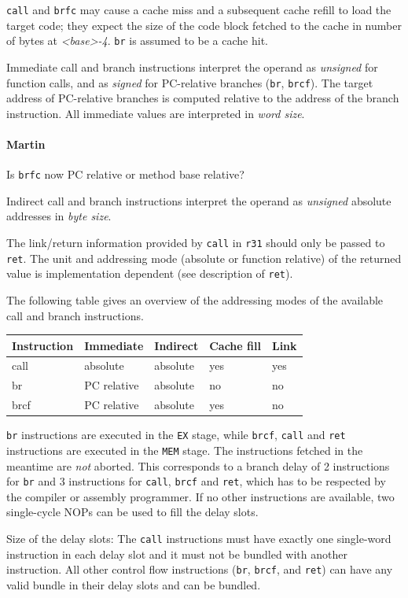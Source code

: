 \documentclass{IEEEtran}
\newcommand{\comment}[3]{\paragraph*{\textbf{#1}}{\color{#3}#2}}
\newcommand{\martin}[1]{\comment{Martin}{#1}{Blue}}
\begin{document}
\texttt{call} and \texttt{brfc} may cause a cache miss and a subsequent
cache refill to load the target code; they expect the size of the code block
fetched to the cache in number of bytes at \textit{\textless base\textgreater-4}.
\texttt{br} is assumed to be a cache hit.

Immediate call and branch instructions interpret the operand as \emph{unsigned} for function calls, and as \emph{signed}
for PC-relative branches (\texttt{br}, \texttt{brcf}).
The target address of PC-relative branches is computed relative to the address of the branch instruction.
All immediate values are interpreted in \emph{word size}. 

\martin{Is \texttt{brfc} now PC relative or method base relative?}

Indirect call and branch instructions interpret the operand as \emph{unsigned} absolute addresses in \emph{byte size}.

The link/return information provided by \texttt{call} in \texttt{r31} should only be 
passed to \texttt{ret}. The unit and addressing mode (absolute or function relative) of 
the returned value is implementation dependent (see description of \texttt{ret}).

The following table gives an overview of the addressing modes of the available 
call and branch instructions.

\medskip
\begin{tabular}{l|llll}
  Instruction & Immediate   & Indirect & Cache fill & Link \\ \hline
  call        & absolute    & absolute & yes        & yes \\
  br          & PC relative & absolute & no         & no \\
  brcf        & PC relative & absolute & yes        & no \\
\end{tabular}

\medskip
\texttt{br} instructions are executed in the \texttt{EX} stage, while \texttt{brcf}, \texttt{call} and \texttt{ret} instructions are executed in the
\texttt{MEM} stage.
The instructions fetched in the meantime are \emph{not} aborted.
This corresponds to a branch delay of 2 instructions for \texttt{br} and 3 instructions for \texttt{call}, \texttt{brcf} and \texttt{ret}, which has to be
respected by the compiler or assembly programmer.
If no other instructions are available, two single-cycle NOPs can be 
used to fill the delay slots.

Size of the delay slots: The \texttt{call} instructions must have exactly one single-word instruction
in each delay slot and it must not be bundled with another instruction. 
All other control flow instructions (\texttt{br}, \texttt{brcf}, and \texttt{ret})
can have any valid bundle in their delay slots and can be bundled.
\end{document}
